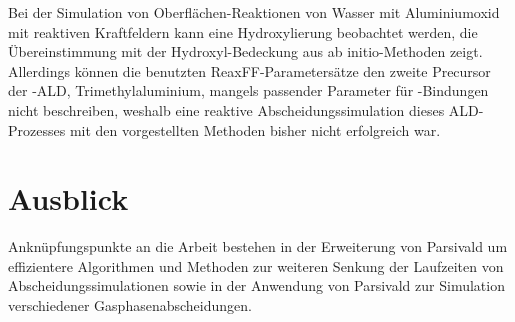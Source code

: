 

Bei der Simulation von Oberflächen-Reaktionen von Wasser mit Aluminiumoxid mit reaktiven Kraftfeldern kann eine Hydroxylierung beobachtet werden, die Übereinstimmung mit der Hydroxyl-Bedeckung aus ab initio-Methoden zeigt.
Allerdings können die benutzten ReaxFF-Parametersätze den zweite Precursor der -ALD, Trimethylaluminium, mangels passender Parameter für -Bindungen nicht beschreiben, weshalb eine reaktive Abscheidungssimulation dieses ALD-Prozesses mit den vorgestellten Methoden bisher nicht erfolgreich war.

\section{Ausblick}
Anknüpfungspunkte an die Arbeit bestehen in der Erweiterung von Parsivald um effizientere Algorithmen und Methoden zur weiteren Senkung der Laufzeiten von Abscheidungssimulationen sowie in der Anwendung von Parsivald zur Simulation verschiedener Gasphasenabscheidungen.


